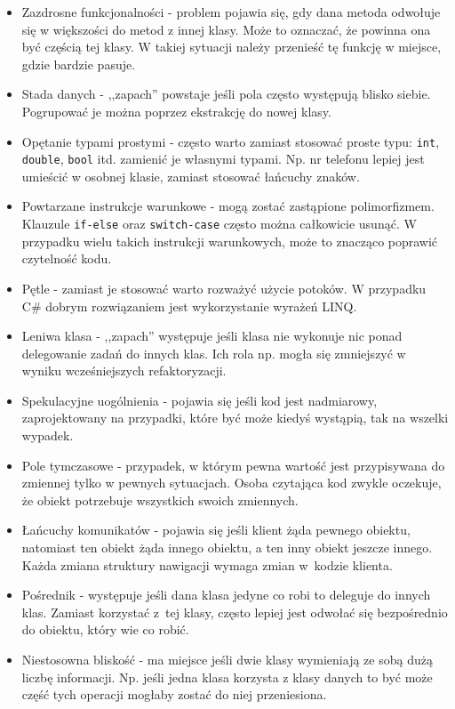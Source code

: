 \begin{itemize}
	\item Zazdrosne funkcjonalności - problem pojawia się, gdy dana metoda odwołuje się w większości do metod z innej klasy. Może to oznaczać, że powinna ona być częścią tej klasy. W takiej sytuacji należy przenieść tę funkcję w miejsce, gdzie bardzie pasuje.
	\item Stada danych - ,,zapach'' powstaje jeśli pola często występują blisko siebie. Pogrupować je można poprzez ekstrakcję do nowej klasy. 
	\item Opętanie typami prostymi - często warto zamiast stosować proste typu: \texttt{int}, \texttt{double}, \texttt{bool} itd. zamienić je własnymi typami. Np. nr telefonu lepiej jest umieścić w osobnej klasie, zamiast stosować łańcuchy znaków.
	\item Powtarzane instrukcje warunkowe - mogą zostać zastąpione polimorfizmem. Klauzule \texttt{if-else} oraz \texttt{switch-case} często można całkowicie usunąć. W przypadku wielu takich instrukcji warunkowych, może to znacząco poprawić czytelność kodu.
	\item Pętle - zamiast je stosować warto rozważyć użycie potoków. W przypadku C\# dobrym rozwiązaniem jest wykorzystanie wyrażeń LINQ.
	\item Leniwa klasa - ,,zapach'' występuje jeśli klasa nie wykonuje nic ponad delegowanie zadań do innych klas. Ich rola np. mogła się zmniejszyć w wyniku wcześniejszych refaktoryzacji. 
	\item Spekulacyjne uogólnienia - pojawia się jeśli kod jest nadmiarowy, zaprojektowany na przypadki, które być może kiedyś wystąpią, tak na wszelki wypadek.
	\item Pole tymczasowe - przypadek, w którym pewna wartość jest przypisywana do zmiennej tylko w pewnych sytuacjach. Osoba czytająca kod zwykle oczekuje, że obiekt potrzebuje wszystkich swoich zmiennych.
	\item Łańcuchy komunikatów - pojawia się jeśli klient żąda pewnego obiektu, natomiast ten obiekt żąda innego obiektu, a ten inny obiekt jeszcze innego. Każda zmiana struktury nawigacji wymaga zmian w~kodzie klienta.
	\item Pośrednik - występuje jeśli dana klasa jedyne co robi to deleguje do innych klas. Zamiast korzystać z~tej klasy, często lepiej jest odwołać się bezpośrednio do obiektu, który wie co robić.
	\item Niestosowna bliskość - ma miejsce jeśli dwie klasy wymieniają ze sobą dużą liczbę informacji. Np. jeśli jedna klasa korzysta z klasy danych to być może część tych operacji mogłaby zostać do niej przeniesiona. 

\end{itemize}
